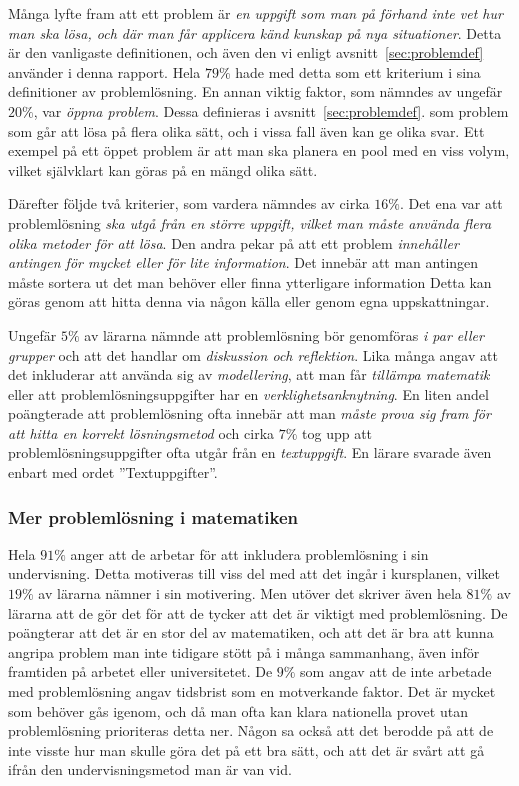     \textcolor{lila}{Många lyfte fram att ett problem är \textsl{en uppgift som man på förhand inte vet hur man ska lösa, och där man får applicera känd kunskap på nya situationer}. Detta är den vanligaste definitionen, och även den vi enligt avsnitt~\ref{sec:problemdef} använder i denna rapport. Hela $79\%$ hade med detta som ett kriterium i sina definitioner av problemlösning.}
    \textcolor{lila}{En annan viktig faktor, som nämndes av ungefär $20\%$, var \textsl{öppna problem}. Dessa definieras i avsnitt~\ref{sec:problemdef}. som problem som går att lösa på flera olika sätt, och i vissa fall även kan ge olika svar. Ett exempel på ett öppet problem är att man ska planera en pool med en viss volym, vilket självklart kan göras på en mängd olika sätt.}

    \textcolor{lila}{Därefter följde två kriterier, som vardera nämndes av cirka $16\%$. Det ena var att problemlösning \textsl{ska utgå från en större uppgift, vilket man måste använda flera olika metoder för att lösa}. Den andra pekar på att ett problem \textsl{innehåller antingen för mycket eller för lite information}. Det innebär att man antingen måste sortera ut det man behöver eller finna ytterligare information Detta kan göras genom att hitta denna via någon källa eller genom egna uppskattningar.}

    \textcolor{lila}{Ungefär $5\%$ av lärarna nämnde att problemlösning bör genomföras \textsl{i par eller grupper} och att det handlar om \textsl{diskussion och reflektion}. Lika många angav att det inkluderar att använda sig av \textsl{modellering}, att man får \textsl{tillämpa matematik} eller att problemlösningsuppgifter har en \textsl{verklighetsanknytning}. En liten andel poängterade att problemlösning ofta innebär att man \textsl{måste prova sig fram för att hitta en korrekt lösningsmetod} och cirka $7\%$ tog upp att problemlösningsuppgifter ofta utgår från en \textsl{textuppgift}. En lärare svarade även enbart med ordet ''Textuppgifter''.}

\subsubsection{Mer problemlösning i matematiken}
\label{sec:MerProblemlosning}

\textcolor{lila}{Hela $91\%$ anger att de arbetar för att inkludera problemlösning i sin undervisning. Detta motiveras till viss del med att det ingår i kursplanen, vilket $19\%$ av lärarna nämner i sin motivering. Men utöver det skriver även hela $81\%$ av lärarna att de gör det för att de tycker att det är viktigt med problemlösning. De poängterar att det är en stor del av matematiken, och att det är bra att kunna angripa problem man inte tidigare stött på i många sammanhang, även inför framtiden på arbetet eller universitetet. De $9\%$ som angav att de inte arbetade med problemlösning angav tidsbrist som en motverkande faktor. Det är mycket som behöver gås igenom, och då man ofta kan klara nationella provet utan problemlösning prioriteras detta ner. Någon sa också att det berodde på att de inte visste hur man skulle göra det på ett bra sätt, och att det är svårt att gå ifrån den undervisningsmetod man är van vid.}

